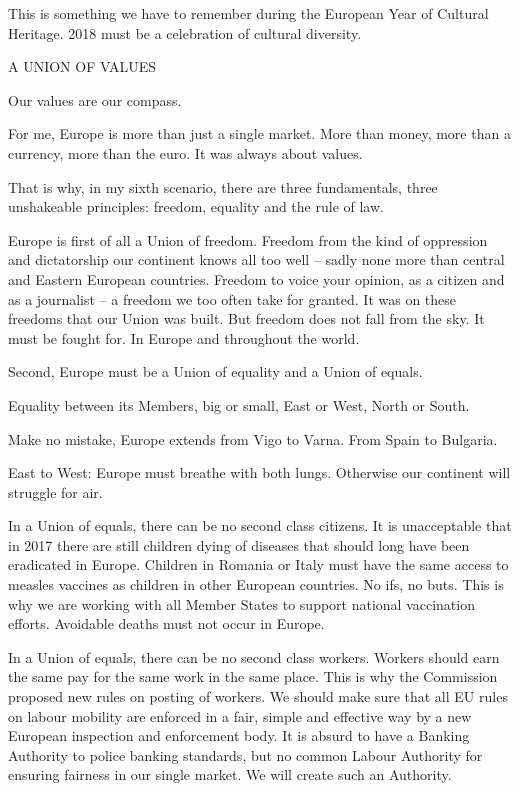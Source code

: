 \documentclass[a4paper,11pt]{article}
\begin{document}
This is something we have to remember during the European Year of Cultural Heritage. 2018 must be a celebration of cultural diversity.

 

 

A UNION OF VALUES

Our values are our compass.

For me, Europe is more than just a single market. More than money, more than a currency, more than the euro. It was always about values.

That is why, in my sixth scenario, there are three fundamentals, three unshakeable principles: freedom, equality and the rule of law.

 

Europe is first of all a Union of freedom. Freedom from the kind of oppression and dictatorship our continent knows all too well – sadly none more than central and Eastern European countries. Freedom to voice your opinion, as a citizen and as a journalist – a freedom we too often take for granted. It was on these freedoms that our Union was built. But freedom does not fall from the sky. It must be fought for. In Europe and throughout the world.

 

Second, Europe must be a Union of equality and a Union of equals.

Equality between its Members, big or small, East or West, North or South.

Make no mistake, Europe extends from Vigo to Varna. From Spain to Bulgaria.

East to West: Europe must breathe with both lungs. Otherwise our continent will struggle for air.

In a Union of equals, there can be no second class citizens. It is unacceptable that in 2017 there are still children dying of diseases that should long have been eradicated in Europe. Children in Romania or Italy must have the same access to measles vaccines as children in other European countries. No ifs, no buts. This is why we are working with all Member States to support national vaccination efforts. Avoidable deaths must not occur in Europe.

In a Union of equals, there can be no second class workers. Workers should earn the same pay for the same work in the same place. This is why the Commission proposed new rules on posting of workers. We should make sure that all EU rules on labour mobility are enforced in a fair, simple and effective way by a new European inspection and enforcement body. It is absurd to have a Banking Authority to police banking standards, but no common Labour Authority for ensuring fairness in our single market. We will create such an Authority.
\end{document}

